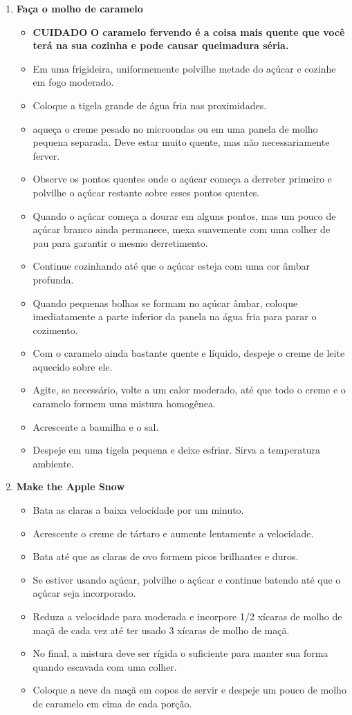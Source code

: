 \documentclass [11pt, letterpaper] {article}
\newcommand \fileName {AppleSnow}
\begin{document}
\begin {description}
\begin {enumerate}
\item {\bf Faça o molho de caramelo}
\begin {itemize}
\item [{\bf CUIDADO}] {\bf O caramelo fervendo é a coisa mais quente que você terá na sua cozinha e pode causar queimadura séria.}
\item Em uma frigideira, uniformemente polvilhe metade do açúcar e cozinhe em fogo moderado.
\item Coloque a tigela grande de água fria nas proximidades.
\item aqueça o creme pesado no microondas ou em uma panela de molho pequena separada. Deve estar muito quente, mas não necessariamente ferver.
\item Observe os pontos quentes onde o açúcar começa a derreter primeiro e polvilhe o açúcar restante sobre esses pontos quentes.
\item Quando o açúcar começa a dourar em alguns pontos, mas um pouco de açúcar branco ainda permanece, mexa suavemente com uma colher de pau para garantir o mesmo derretimento.
\item Continue cozinhando até que o açúcar esteja com uma cor âmbar profunda.
\item Quando pequenas bolhas se formam no açúcar âmbar, coloque imediatamente a parte inferior da panela na água fria para parar o cozimento.
\item Com o caramelo ainda bastante quente e líquido, despeje o creme de leite aquecido sobre ele.
\item Agite, se necessário, volte a um calor moderado, até que todo o creme e o caramelo formem  uma mistura homogênea.
\item Acrescente a baunilha e o sal.
\item Despeje em uma tigela pequena e deixe esfriar. Sirva a temperatura ambiente.
\end {itemize}
\item {\bf Make the Apple Snow}
\begin {itemize}
\item Bata as claras a baixa velocidade por um minuto.
\item Acrescente o creme de tártaro e aumente lentamente a velocidade.
\item Bata até que as claras de ovo formem picos brilhantes e duros.
\item Se estiver usando açúcar, polvilhe o açúcar e continue batendo até que o açúcar seja incorporado.
\item Reduza a velocidade para moderada e incorpore 1/2 xícaras de molho de maçã de cada vez até ter usado 3 xícaras de molho de maçã.
\item No final, a mistura deve ser rígida o suficiente para manter sua forma quando escavada com uma colher.
\item Coloque a neve da maçã em copos de servir e despeje um pouco de molho de caramelo em cima de cada porção.
\end {itemize}
\end {enumerate}
\end {description}


\end{document}
